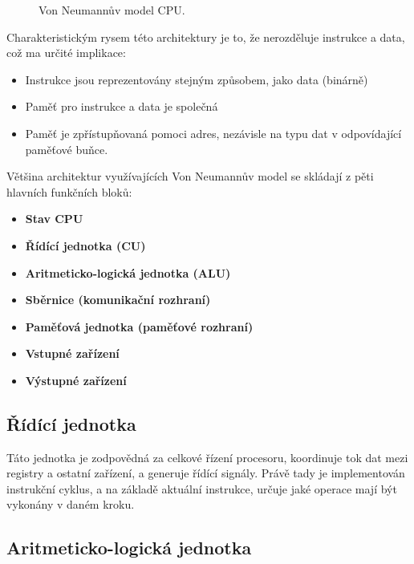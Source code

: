 \begin{figure}[htbp]
    \centering
    
    \caption{Von Neumannův model CPU. }
    \label{fig:von_neumann}
\end{figure}

Charakteristickým rysem této architektury je to, že nerozděluje instrukce a data, což ma určité
implikace:

\begin{itemize}
    \item Instrukce jsou reprezentovány stejným způsobem, jako data (binárně)
    \item Paměť pro instrukce a data je společná
    \item Paměť je zpřístupňovaná pomoci adres, nezávisle na typu dat v odpovídající paměťové buňce.
\end{itemize}

Většina architektur využívajících Von Neumannův model se skládají z pěti hlavních funkčních
bloků:

\begin{itemize}
    \item \textbf{Stav CPU}
    \item \textbf{Řídící jednotka (CU)}
    \item \textbf{Aritmeticko-logická jednotka (ALU)}
    \item \textbf{Sběrnice (komunikační rozhraní)}
    \item \textbf{Paměťová jednotka (paměťové rozhraní)}
    \item \textbf{Vstupné zařízení}
    \item \textbf{Výstupné zařízení}
\end{itemize}

\subsection{Řídící jednotka}

Táto jednotka je zodpovědná za celkové řízení procesoru, koordinuje tok dat mezi registry a ostatní
zařízení, a generuje řídící signály. Právě tady je implementován instrukční cyklus, a na základě
aktuální instrukce, určuje jaké operace mají být vykonány v daném kroku.

\subsection{Aritmeticko-logická jednotka}

